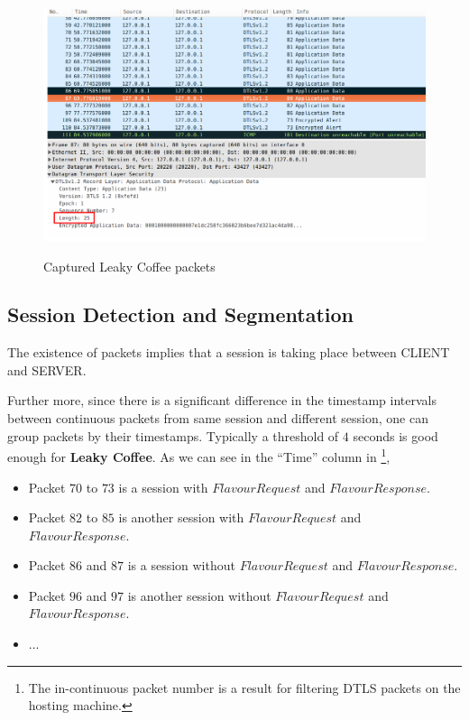 \begin{example}
\begin{figure}[H] 
\centering
\resizebox{14cm}{!}
{\includegraphics{./Pics/Wireshark01.png}}
\caption{Captured Leaky Coffee packets}
\label{Fig: Captured Leaky Coffee packets}
\end{figure}

\subsection{Session Detection and Segmentation}
The existence of packets implies that a session is taking place between CLIENT and SERVER.

Further more, since there is a significant difference in the timestamp intervals between continuous packets from same session and different session, one can group packets by their timestamps. Typically a threshold of $4$ seconds is good enough for \textbf{Leaky Coffee}. As we can see in the “Time” column in \footnote{The in-continuous packet number is a result for filtering DTLS packets on the hosting machine.},
\begin{itemize}
\item Packet $70$ to $73$ is a session with $FlavourRequest$ and $FlavourResponse$.
\item Packet $82$ to $85$ is another session with $FlavourRequest$ and $FlavourResponse$.
\item Packet $86$ and $87$ is a session without $FlavourRequest$ and $FlavourResponse$.
\item Packet $96$ and $97$ is another session without $FlavourRequest$ and $FlavourResponse$.
\item ...
\end{itemize}


\end{example}

